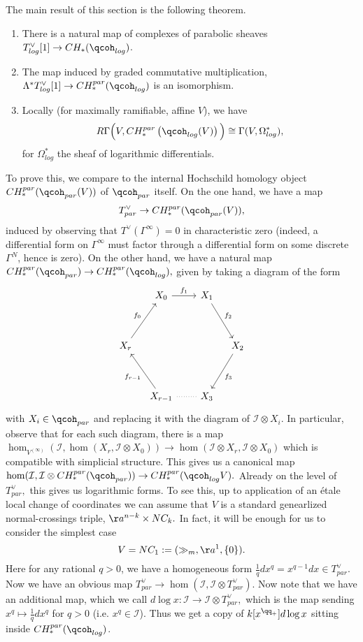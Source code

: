 \documentclass{article}
\newcommand{\I}{\mathcal{I}}
\begin{document}
The main result of this section is the following theorem.
\begin{thm}
  \begin{enumerate}
  \item There is a natural map of complexes of parabolic sheaves $T_{log}^\vee[1]\to CH_*(\qcoh_{log})$.
  \item The map induced by graded commutative multiplication, $\Lambda^*T_{log}^\vee[1]\to CH_*^{par}(\qcoh_{log})$ is an isomorphism.
  \item Locally (for maximally ramifiable, affine $V$), we have $$R\Gamma\Big(V, CH_*^{par}\left(\qcoh_{log}(V)\right)\Big)\cong \Gamma(V, \Omega^*_{log}),$$ for $\Omega^*_{log}$ the sheaf of logarithmic differentials.
  \end{enumerate}
\end{thm}
To prove this, we compare to the internal Hochschild homology object $CH_*^{par}(\qcoh_{par}(V))$ of $\qcoh_{par}$ itself. On the one hand, we have a map $$T^\vee_{par}\to CH_*^{par}(\qcoh_{par}(V)),$$ induced by observing that $T^\vee(\Gamma^\infty) = 0$ in characteristic zero (indeed, a differential form on $\Gamma^\infty$ must factor through a differential form on some discrete $\Gamma^N$, hence is zero). On the other hand, we have a natural map $CH_*^{par}(\qcoh_{par})\to CH_*^{par}(\qcoh_{log}),$ given by taking a diagram of the form
\[
\begin{tikzcd}[row sep=3.6em,column sep=1em]
& X_0\arrow[rr,"f_1"] && X_1 \arrow[dr,"f_2"] \\
X_r\arrow[ur,"f_0"]  &&  && X_2\arrow[dl, "f_3"] \\
& X_{r-1} \arrow[ul,"f_{r-1}"] && X_3 \arrow[ll, dotted, no head]
\end{tikzcd}
\]
with $X_i\in \qcoh_{par}$ and replacing it with the diagram of $\I\otimes X_i.$ In particular, observe that for each such diagram, there is a map $\hom_{V^{(\infty)}}(\I, \hom(X_r, \I\otimes X_0))\to \hom(\I\otimes X_r, \I\otimes X_0)$ which is compatible with simplicial structure. This gives us a canonical map $\hom(\I, \I\otimes CH_*^{par}(\qcoh_{par}))\to CH_*^{par}(\qcoh_{log}V).$ Already on the level of $T^\vee_{par},$ this gives us logarithmic forms. To see this, up to application of an \'etale local change of coordinates we can assume that $V$ is a standard genearlized normal-crossings triple, $\aa^{n-k}\times NC_k.$ In fact, it will be enough for us to consider the simplest case $$V = NC_1 : = (\gg_m, \aa^1, \{0\}).$$ Here for any rational $q> 0$, we have a homogeneous form $\frac{1}{q}d x^{q} = x^{q-1}dx\in T^\vee_{par}.$ Now we have an obvious map $T^\vee_{par}\to \hom(\I, \I\otimes T^\vee_{par}).$ Now note that we have an additional map, which we call $d\log x:\I \to \I\otimes T^\vee_{par},$ which is the map sending $x^q\mapsto \frac{1}{q} d x^q$ for $q> 0$ (i.e. $x^q\in \I$). Thus we get a copy of $k[x^{\qq_+}]d\log x$ sitting inside $CH_*^{par}(\qcoh_{log})$. 
\end{document}
